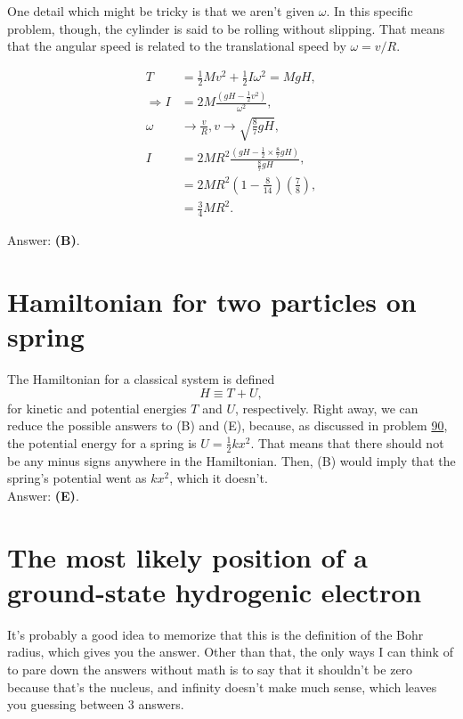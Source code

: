 \documentclass[11pt]{paper}
\newcommand{\answer}[1]{Answer: \textbf{(#1)}.}
\begin{document}
One detail which might be tricky is that we aren't given $\omega$.  In this specific problem, though, the cylinder is said to be rolling without slipping.  That means that the angular speed is related to the translational speed by $\omega = v/R$.

\begin{align}
	T &= \frac{1}{2}Mv^2 + \frac{1}{2}I\omega^2 = MgH,\\
	\Rightarrow I &= 2M\frac{\left(gH - \frac{1}{2}v^2\right)}{\omega^2},\\
	\omega&\rightarrow \frac{v}{R}, v\rightarrow\sqrt{\frac{8}{7}gH},\\
	I &= 2MR^2\frac{\left(gH - \frac{1}{2}\times\frac{8}{7}gH\right)}{\frac{8}{7}gH},\\
	&= 2MR^2\left(1-\frac{8}{14}\right)\left(\frac{7}{8}\right),\\
	&= \frac{3}{4}MR^2.
\end{align}

\answer{B}

\section{Hamiltonian for two particles on spring}

The Hamiltonian for a classical system is defined
\begin{equation}
	H\equiv T+U,
\end{equation}
for kinetic and potential energies $T$ and $U$, respectively.  Right away, we can reduce the possible answers to (B) and (E), because, as discussed in problem \hyperlink{section.90}{90}, the potential energy for a spring is $U = \frac{1}{2}kx^2$.  That means that there should not be any minus signs anywhere in the Hamiltonian.  Then, (B) would imply that the spring's potential went as $kx^2$, which it doesn't.\\

\answer{E}

\section{The most likely position of a ground-state hydrogenic electron}

It's probably a good idea to memorize that this is the definition of the Bohr radius, which gives you the answer.  Other than that, the only ways I can think of to pare down the answers without math is to say that it shouldn't be zero because that's the nucleus, and infinity doesn't make much sense, which leaves you guessing between 3 answers.
\end{document}
